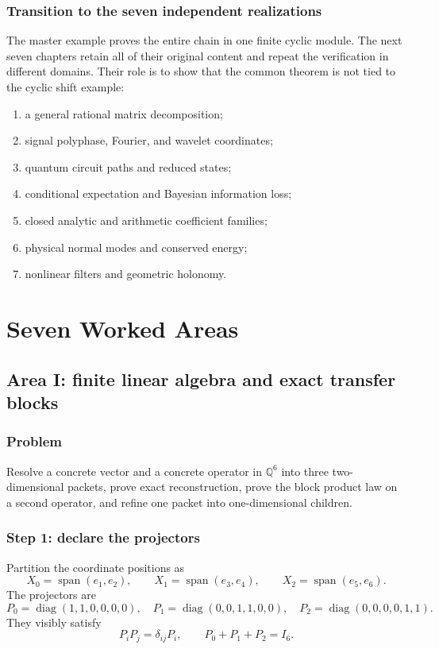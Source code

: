 \documentclass[11pt,oneside]{book}
\theoremstyle{definition}
\theoremstyle{remark}
\DeclareMathOperator{\diag}{diag}
\newcommand{\Q}{\mathbb Q}
\begin{document}
\section{Transition to the seven independent realizations}
The master example proves the entire chain in one finite cyclic module.  The next seven chapters retain all of their original content and repeat the verification in different domains.  Their role is to show that the common theorem is not tied to the cyclic shift example:
\begin{enumerate}[label=\arabic*.,leftmargin=2em]
\item a general rational matrix decomposition;
\item signal polyphase, Fourier, and wavelet coordinates;
\item quantum circuit paths and reduced states;
\item conditional expectation and Bayesian information loss;
\item closed analytic and arithmetic coefficient families;
\item physical normal modes and conserved energy;
\item nonlinear filters and geometric holonomy.
\end{enumerate}

\part{Seven Worked Areas}

\chapter{Area I: finite linear algebra and exact transfer blocks}\label{ch:linear}

\section{Problem}
Resolve a concrete vector and a concrete operator in $\Q^6$ into three two-dimensional packets, prove exact reconstruction, prove the block product law on a second operator, and refine one packet into one-dimensional children.

\section{Step 1: declare the projectors}
Partition the coordinate positions as
\[
X_0=\operatorname{span}(e_1,e_2),\qquad
X_1=\operatorname{span}(e_3,e_4),\qquad
X_2=\operatorname{span}(e_5,e_6).
\]
The projectors are
\[
P_0=\diag(1,1,0,0,0,0),
\quad
P_1=\diag(0,0,1,1,0,0),
\quad
P_2=\diag(0,0,0,0,1,1).
\]
They visibly satisfy
\[
P_iP_j=\delta_{ij}P_i,
\qquad P_0+P_1+P_2=I_6.
\]
\end{document}
